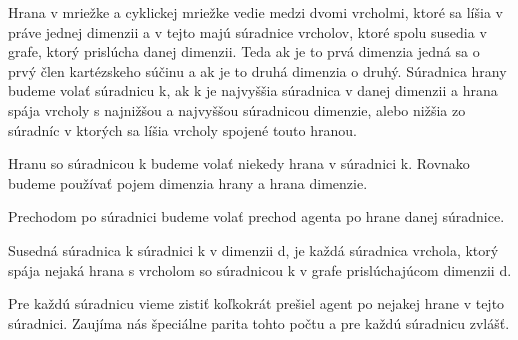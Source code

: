 \begin{ozn}
Hrana v mriežke a cyklickej mriežke vedie medzi dvomi vrcholmi, 
ktoré sa líšia v práve jednej dimenzii a v tejto majú súradnice vrcholov,
ktoré spolu susedia v grafe, ktorý prislúcha danej dimenzii. Teda ak je to
prvá dimenzia jedná sa o prvý člen kartézskeho súčinu a ak je to druhá
dimenzia o druhý. Súradnica hrany budeme volať súradnicu k, ak k je
najvyššia súradnica v danej dimenzii a hrana spája vrcholy s najnižšou a
najvyššou súradnicou dimenzie, alebo nižšia zo súradníc v ktorých sa líšia
vrcholy spojené touto hranou.

Hranu so súradnicou k budeme volať niekedy hrana v súradnici k. Rovnako
budeme používať pojem dimenzia hrany a hrana dimenzie.
\end{ozn}
\begin{ozn}
Prechodom po súradnici budeme volať prechod agenta po hrane danej súradnice.
\end{ozn}

\begin{ozn}
Susedná súradnica k súradnici k v dimenzii d, je každá súradnica vrchola,
ktorý
spája nejaká hrana s vrcholom so súradnicou k 
v grafe prislúchajúcom dimenzii d.
\end{ozn}

Pre každú súradnicu vieme zistiť koľkokrát prešiel agent po nejakej hrane v
tejto súradnici. Zaujíma nás špeciálne parita tohto počtu a pre každú
súradnicu zvlášť.

